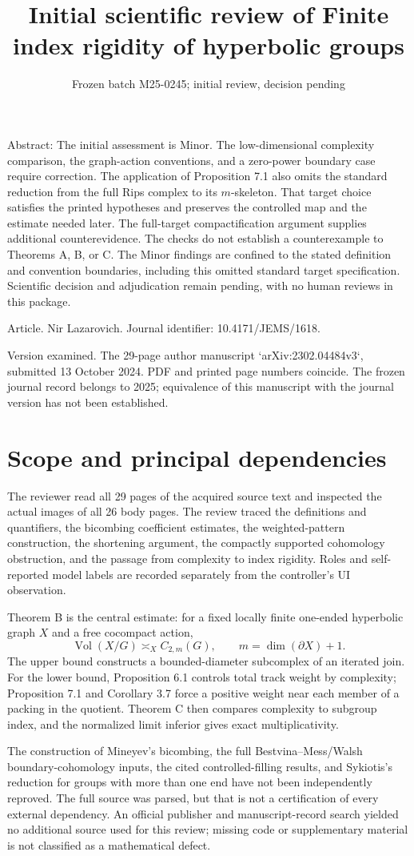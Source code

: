 \documentclass[10pt]{article}
\title{Initial scientific review of
Finite index rigidity of hyperbolic groups}
\author{}
\date{Frozen batch M25-0245; initial review, decision pending}
\begin{document}
\maketitle
Abstract: The initial assessment is Minor. The low-dimensional complexity comparison, the graph-action conventions, and a zero-power boundary case require correction. The application of Proposition 7.1 also omits the standard reduction from the full Rips complex to its \(m\)-skeleton. That target choice satisfies the printed hypotheses and preserves the controlled map and the estimate needed later. The full-target compactification argument supplies additional counterevidence. The checks do not establish a counterexample to Theorems A, B, or C. The Minor findings are confined to the stated definition and convention boundaries, including this omitted standard target specification. Scientific decision and adjudication remain pending, with no human reviews in this package.\par
Article. Nir Lazarovich. Journal identifier: 10.4171/JEMS/1618.\par
Version examined. The 29-page author manuscript `arXiv:2302.04484v3`, submitted 13 October 2024. PDF and printed page numbers coincide. The frozen journal record belongs to 2025; equivalence of this manuscript with the journal version has not been established.\par
\section*{Scope and principal dependencies}
The reviewer read all 29 pages of the acquired source text and inspected the actual images of all 26 body pages. The review traced the definitions and quantifiers, the bicombing coefficient estimates, the weighted-pattern construction, the shortening argument, the compactly supported cohomology obstruction, and the passage from complexity to index rigidity. Roles and self-reported model labels are recorded separately from the controller’s UI observation.\par
Theorem B is the central estimate: for a fixed locally finite one-ended hyperbolic graph \(X\) and a free cocompact action, \[\operatorname{Vol}(X/G)\asymp_X C_{2,m}(G),\qquad m=\dim(\partial X)+1.\] The upper bound constructs a bounded-diameter subcomplex of an iterated join. For the lower bound, Proposition 6.1 controls total track weight by complexity; Proposition 7.1 and Corollary 3.7 force a positive weight near each member of a packing in the quotient. Theorem C then compares complexity to subgroup index, and the normalized limit inferior gives exact multiplicativity.\par
The construction of Mineyev’s bicombing, the full Bestvina–Mess/Walsh boundary-cohomology inputs, the cited controlled-filling results, and Sykiotis’s reduction for groups with more than one end have not been independently reproved. The full source was parsed, but that is not a certification of every external dependency. An official publisher and manuscript-record search yielded no additional source used for this review; missing code or supplementary material is not classified as a mathematical defect.\par
\end{document}
